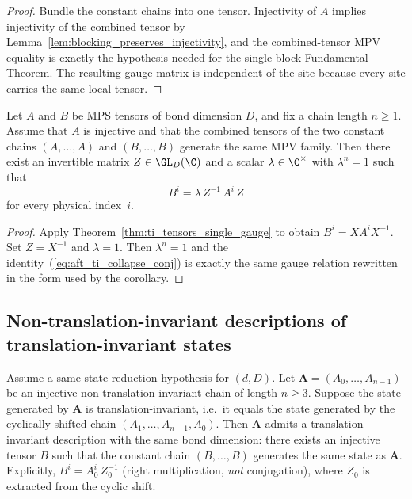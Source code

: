 \begin{proof}
    \leanok
    Bundle the constant chains into one tensor.
    Injectivity of $A$ implies injectivity of the combined tensor by
    Lemma~\ref{lem:blocking_preserves_injectivity}, and the combined-tensor MPV
    equality is exactly the hypothesis needed for the single-block
    Fundamental Theorem.
    The resulting gauge matrix is independent of the site because every site
    carries the same local tensor.
\end{proof}

\begin{corollary}\label{cor:ft_ti_chain}
    \leanok
    Let $A$ and $B$ be MPS tensors of bond dimension $D$, and fix a chain
    length $n \ge 1$.
    Assume that $A$ is injective and that the combined tensors of the two
    constant chains $(A, \ldots, A)$ and $(B, \ldots, B)$ generate the same
    MPV family.
    Then there exist an invertible matrix $Z \in \GL_D(\C)$ and a scalar
    $\lambda \in \C^{\times}$ with $\lambda^n = 1$ such that
    \begin{equation}\label{eq:aft_ti_collapse_conj}
        B^i = \lambda\, Z^{-1}\, A^i\, Z
    \end{equation}
    for every physical index~$i$.
\end{corollary}

\begin{proof}
    \leanok
    Apply Theorem~\ref{thm:ti_tensors_single_gauge} to obtain
    $B^i = X A^i X^{-1}$.
    Set $Z = X^{-1}$ and $\lambda = 1$.
    Then $\lambda^n = 1$ and the identity~(\ref{eq:aft_ti_collapse_conj}) is
    exactly the same gauge relation rewritten in the form used by the corollary.
\end{proof}

\subsection{Non-translation-invariant descriptions of translation-invariant states}

\begin{corollary}%
    \label{cor:non_ti_to_ti}
    \notready
    Assume a same-state reduction hypothesis for $(d,D)$.
    Let $\mathbf{A} = (A_0, \ldots, A_{n-1})$ be an injective
    non-translation-invariant chain of length $n \ge 3$.
    Suppose the state generated by $\mathbf{A}$ is translation-invariant,
    i.e.\ it equals the state generated by the cyclically shifted chain
    $(A_1, \ldots, A_{n-1}, A_0)$.
    Then $\mathbf{A}$ admits a translation-invariant description with the
    same bond dimension: there exists an injective tensor $B$ such that
    the constant chain $(B, \ldots, B)$ generates the same state as
    $\mathbf{A}$.
    Explicitly, $B^i = A_0^i\, Z_0^{-1}$ (right multiplication,
    \emph{not} conjugation), where $Z_0$ is extracted from the cyclic shift.
\end{corollary}

